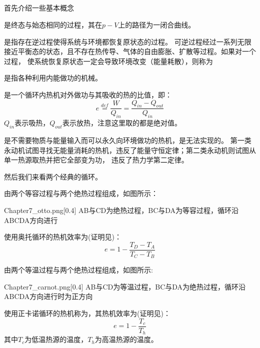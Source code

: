         \subsection[热机]{}
            首先介绍一些基本概念
            \begin{Itemize}
                \item {}是终态与始态相同的过程，其在$p-V$上的路径为一闭合曲线。
                \item {}是指存在逆过程使得系统与环境都恢复原状态的过程。
                可逆过程经过一系列无限接近平衡态的状态，且不存在热传导、气体的自由膨胀、扩散等过程。如果对一个过程，
                使系统恢复原状态一定会导致环境改变（能量耗散），则称为
                \item {}是指各种利用内能做功的机械。
                \item {}是一个循环内热机对外做功与其吸收的热的比值，即：
                \begin{equation}
                    e \overset{def}{=} \frac{W}{Q_{in}} = \frac{Q_{in}-Q_{out}}{Q_{in}}
                    \nonumber
                \end{equation}
                $Q_{in}$表示吸热，$Q_{out}$表示放热，注意这里取的都是绝对值。
                \item {}是不需要物质与能量输入而可以永久向环境做功的热机，是无法实现的。
                第一类永动机试图寻找无能量消耗的热机，违反了能量守恒定律；第二类永动机则试图从单一热源取热并把它全部变为功，
                违反了热力学第二定律。
            \end{Itemize}
            然后我们来看两个经典的循环。

            由两个等容过程与两个绝热过程组成，如图所示：
            \begin{singlefigure}{Chapter7_otto.png}[0.4]
                AB与CD为绝热过程，BC与DA为等容过程，循环沿ABCDA方向进行
            \end{singlefigure}
            使用奥托循环的热机效率为(证明见)：
            \begin{equation}
                e = 1 - \frac{T_{D} - T_{A}}{T_{C} - T_{B}}
                \nonumber
            \end{equation}
            
            由两个等温过程与两个绝热过程组成，如图所示:
            \begin{singlefigure}{Chapter7_carnot.png}[0.4]
                AB与CD为等温过程，BC与DA为绝热过程，循环沿ABCDA方向进行时为正方向
            \end{singlefigure}
            使用正卡诺循环的热机称为，其热机效率为(证明见)：
            \begin{equation}
                e = 1 - \frac{T_{c}}{T_{h}}
                \nonumber
            \end{equation}
            其中$T_c$为低温热源的温度，$T_h$为高温热源的温度。

